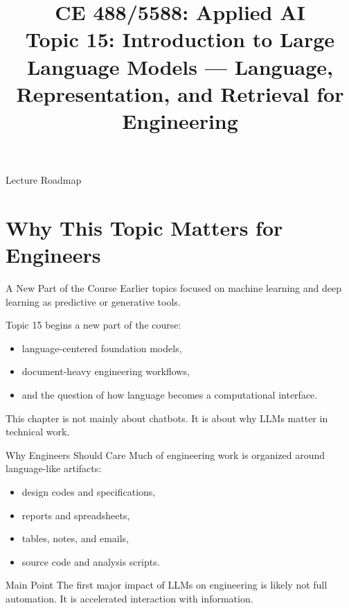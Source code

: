 \documentclass[12pt]{beamer}
\title[Topic 15: Introduction to LLMs]{CE 488/5588: Applied AI\\Topic 15: Introduction to Large Language Models --- Language, Representation, and Retrieval for Engineering}
\author{}
\date{}
\begin{document}
\begin{frame}
  \titlepage
\end{frame}

\begin{frame}{Lecture Roadmap}
  \tableofcontents
\end{frame}

\section{Why This Topic Matters for Engineers}

\begin{frame}{A New Part of the Course}
  Earlier topics focused on machine learning and deep learning as predictive or generative tools.

  Topic 15 begins a new part of the course:
  \begin{itemize}
    \item language-centered foundation models,
    \item document-heavy engineering workflows,
    \item and the question of how language becomes a computational interface.
  \end{itemize}

  This chapter is not mainly about chatbots. It is about why LLMs matter in technical work.
\end{frame}

\begin{frame}{Why Engineers Should Care}
  Much of engineering work is organized around language-like artifacts:
  \begin{itemize}
    \item design codes and specifications,
    \item reports and spreadsheets,
    \item tables, notes, and emails,
    \item source code and analysis scripts.
  \end{itemize}

  \begin{conceptbox}{Main Point}
    The first major impact of LLMs on engineering is likely not full automation. It is accelerated interaction with information.
  \end{conceptbox}
\end{frame}
\end{document}
